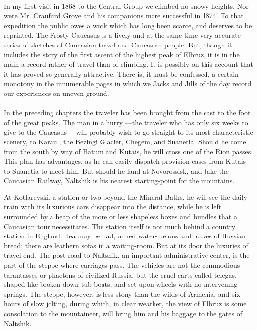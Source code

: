 \documentclass[25pt, a4paper]{article}
\begin{document}
\paragraph{} In my first visit in 1868 to the Central Group we climbed no snowy heights. Nor were Mr. Craufurd Grove and his companions more successful in 1874. To that expedition the public owes a work which has long been scarce, and deserves to be reprinted. The Frosty Caucasus is a lively and at the same time very accurate series of sketches of Caucasian travel and Caucasian people. But, though it includes the story of the first ascent of the highest peak of Elbruz, it is in the main a record rather of travel than of climbing. It is possibly on this account that it has proved so generally attractive. There is, it must be confessed, a certain monotony in the innumerable pages in which we Jacks and Jills of the day record our experiences on uneven ground.
	
\paragraph{} In the preceding chapters the traveler has been brought from the east to the foot of the great peaks. The man in a hurry —the traveler who has only six weeks to give to the Caucasus —will probably wish to go straight to its most characteristic scenery, to Karaul, the Bezingi Glacier, Chegem, and Suanetia. Should he come from the south by way of Batum and Kutais, he will cross one of the Rion passes. This plan has advantages, as he can easily dispatch provision cases from Kutais to Suanetia to meet him. But should he land at Novorossisk, and take the Caucasian Railway, Naltshik is his nearest starting-point for the mountains.
	
	At Kotlarevski, a station or two beyond the Mineral Baths, he will see the daily train with its luxurious cars disappear into the distance, while he is left surrounded by a heap of the more or less shapeless boxes and bundles that a Caucasian tour necessitates. The station itself is not much behind a country station in England. Tea may be had, or red water-melons and loaves of Russian bread; there are leathern sofas in a waiting-room. But at its door the luxuries of travel end. The post-road to Naltshik, an important administrative center, is the part of the steppe where carriages pass. The vehicles are not the commodious tarantasses or phaetons of civilized Russia, but the cruel carts called telegas, shaped like broken-down tub-boats, and set upon wheels with no intervening springs. The steppe, however, is less stony than the wilds of Armenia, and six hours of slow jolting, during which, in clear weather, the view of Elbruz is some consolation to the mountaineer, will bring him and his baggage to the gates of Naltshik.
	
\end{document}
